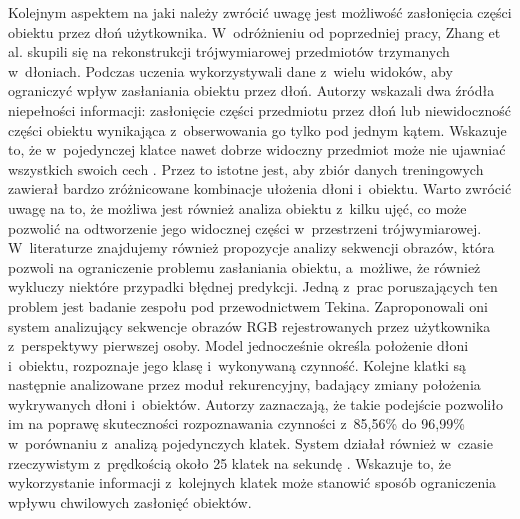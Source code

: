 Kolejnym aspektem na jaki należy zwrócić uwagę jest możliwość zasłonięcia części obiektu przez dłoń użytkownika. W~odróżnieniu od poprzedniej pracy, Zhang et al. skupili się na rekonstrukcji trójwymiarowej przedmiotów trzymanych w~dłoniach. Podczas uczenia wykorzystywali dane z~wielu widoków, aby ograniczyć wpływ zasłaniania obiektu przez dłoń. Autorzy wskazali dwa źródła niepełności informacji: zasłonięcie części przedmiotu przez dłoń lub niewidoczność części obiektu wynikająca z~obserwowania go tylko pod jednym kątem. Wskazuje to, że w~pojedynczej klatce nawet dobrze widoczny przedmiot może nie ujawniać wszystkich swoich cech \cite{bib:Zhang_2024_CVPR}. Przez to istotne jest, aby zbiór danych treningowych zawierał bardzo zróżnicowane kombinacje ułożenia dłoni i~obiektu. Warto zwrócić uwagę na to, że możliwa jest również analiza obiektu z~kilku ujęć, co może pozwolić na odtworzenie jego widocznej części w~przestrzeni trójwymiarowej. W~literaturze znajdujemy również propozycje analizy sekwencji obrazów, która pozwoli na ograniczenie problemu zasłaniania obiektu, a~możliwe, że również wykluczy niektóre przypadki błędnej predykcji. Jedną z~prac poruszających ten problem jest badanie zespołu pod przewodnictwem Tekina. Zaproponowali oni system analizujący sekwencje obrazów RGB rejestrowanych przez użytkownika z~perspektywy pierwszej osoby. Model jednocześnie określa położenie dłoni i~obiektu, rozpoznaje jego klasę i~wykonywaną czynność. Kolejne klatki są następnie analizowane przez moduł rekurencyjny, badający zmiany położenia wykrywanych dłoni i~obiektów. Autorzy zaznaczają, że takie podejście pozwoliło im na poprawę skuteczności rozpoznawania czynności z~85,56\% do 96,99\% w~porównaniu z~analizą pojedynczych klatek. System działał również w~czasie rzeczywistym z~prędkością około 25 klatek na sekundę \cite{bib:Tekin_2019_CVPR}. Wskazuje to, że wykorzystanie informacji z~kolejnych klatek może stanowić sposób ograniczenia wpływu chwilowych zasłonięć obiektów.

